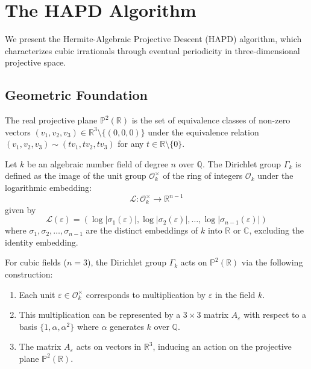\section{The HAPD Algorithm}\label{sec:hapd}

We present the Hermite-Algebraic Projective Descent (HAPD) algorithm, which characterizes cubic irrationals through eventual periodicity in three-dimensional projective space.

\subsection{Geometric Foundation}

\begin{definition}
The real projective plane $\mathbb{P}^2(\mathbb{R})$ is the set of equivalence classes of non-zero vectors $(v_1, v_2, v_3) \in \mathbb{R}^3 \setminus \{(0,0,0)\}$ under the equivalence relation $(v_1, v_2, v_3) \sim (tv_1, tv_2, tv_3)$ for any $t \in \mathbb{R} \setminus \{0\}$.
\end{definition}

\begin{definition}\label{def:dirichlet_group}
Let $k$ be an algebraic number field of degree $n$ over $\mathbb{Q}$. The Dirichlet group $\Gamma_k$ is defined as the image of the unit group $\mathcal{O}_k^\times$ of the ring of integers $\mathcal{O}_k$ under the logarithmic embedding:
\begin{equation}
\mathcal{L}: \mathcal{O}_k^\times \to \mathbb{R}^{n-1}
\end{equation}
given by
\begin{equation}
\mathcal{L}(\varepsilon) = (\log|\sigma_1(\varepsilon)|, \log|\sigma_2(\varepsilon)|, \ldots, \log|\sigma_{n-1}(\varepsilon)|)
\end{equation}
where $\sigma_1, \sigma_2, \ldots, \sigma_{n-1}$ are the distinct embeddings of $k$ into $\mathbb{R}$ or $\mathbb{C}$, excluding the identity embedding.

For cubic fields ($n=3$), the Dirichlet group $\Gamma_k$ acts on $\mathbb{P}^2(\mathbb{R})$ via the following construction:
\begin{enumerate}
\item Each unit $\varepsilon \in \mathcal{O}_k^\times$ corresponds to multiplication by $\varepsilon$ in the field $k$.
\item This multiplication can be represented by a $3 \times 3$ matrix $A_\varepsilon$ with respect to a basis $\{1, \alpha, \alpha^2\}$ where $\alpha$ generates $k$ over $\mathbb{Q}$.
\item The matrix $A_\varepsilon$ acts on vectors in $\mathbb{R}^3$, inducing an action on the projective plane $\mathbb{P}^2(\mathbb{R})$.
\end{enumerate}
\end{definition}

